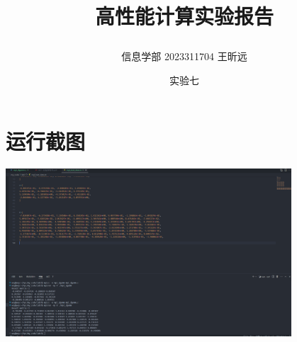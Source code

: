 \documentclass{article} %
\begin{document}
    \title{\centerline{高性能计算实验报告}}
    \date{实验七}
    \author{信息学部 2023311704 王昕远}
    \maketitle
    \thispagestyle{empty}



\section{运行截图}
\includegraphics[width=0.8\textwidth]{i.png}






$$
$$
\end{document}
